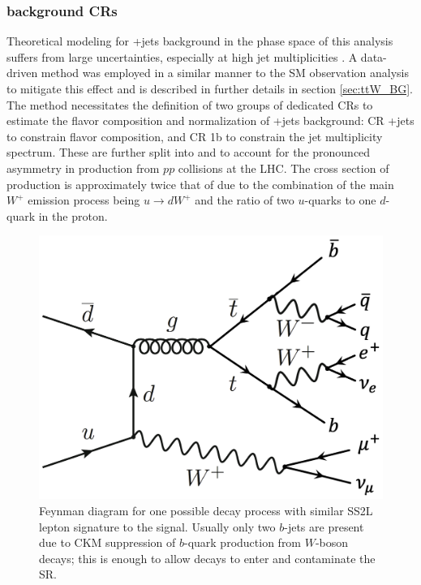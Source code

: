 \documentclass[../thesis.tex]{subfiles}
\begin{document}
\subsubsection*{\ttW background \acs{CR}s}
Theoretical modeling for \ttW+jets background in the phase space of this analysis suffers from large uncertainties, especially at high jet multiplicities \citep{bg:ttH_ttW_ML}.
A data-driven method was employed in a similar manner to the \acs{SM} \tttt observation analysis \citep{tttt_obs} to mitigate this effect and is described in further details in section \ref{sec:ttW_BG}. The method necessitates the definition of two groups of dedicated \acs{CR}s to estimate the flavor composition and normalization of \ttW+jets background: \acs{CR} \ttW+jets to constrain flavor composition, and \acs{CR} 1b to constrain the jet multiplicity spectrum. These are further split into \CRttWpm and \CRonebpm to account for the pronounced asymmetry in \ttW production from $pp$ collisions at the \acs{LHC}. The cross section of \ttWplus production is approximately twice that of \ttWminus \citep{ana:ttW_meas} due to the combination of the main $W^+$ emission process being $u\rightarrow dW^+$ and the ratio of two $u$-quarks to one $d$-quark in the proton.

\begin{figure}[!htb]
\begin{center}
\includegraphics[width=0.5\linewidth]{fig/theory_ttW_decay.png}
\caption{\label{fig:bg:ttW_decay}Feynman diagram for one possible \ttW decay process with similar \acs{SS2L} lepton signature to the \ttZp signal. Usually only two $b$-jets are present due to \acs{CKM} suppression of $b$-quark production from $W$-boson decays; this is enough to allow \ttW decays to enter and contaminate the \acs{SR}.}
\end{center}
\end{figure}
\end{document}
